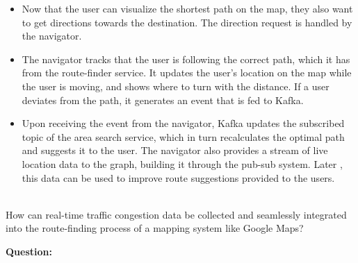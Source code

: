 \begin{itemize}
\begin{itemize}
\item
The route finder forwards the requests to an area search service with the source and the destination points.
\item
The area search service uses the distributed search to find the latitude/longitude for the source and the destination. It then calculates the area on the map spanning the two (source's and destination's) latitude/longitude points.
\item
After finding the area, the area search service asks the graph processing service to process part of the graph, depending on the area to find the optimal path.
\item
The graph processing service fetches the edges and nodes within that specified area from the database, finds the shortest path, and returns it to the route-finder service that visualizes the optimal path with the distance and time necessary to comeplete the route. It also displays the steps the user should follow for navigation.
\end{itemize}
\item
\protect{}\label{NxDi3RJc9fdWqSgFOlijI}
Now that the user can visualize the shortest path on the map, they also want to get directions towards the destination. The direction request is handled by the navigator.
\item
\protect{}\label{2RgVGB2QJdQM8UPs1y_iX}
The navigator tracks that the user is following the correct path, which it has from the route-finder service. It updates the user's location on the map while the user is moving, and shows where to turn with the distance. If a user deviates from the path, it generates an event that is fed to Kafka.
\item
\protect{}\label{CDHa6bIwob-VPlSjT3dKH}
Upon receiving the event from the navigator, Kafka updates the subscribed topic of the area search service, which in turn recalculates the optimal path and suggests it to the user. The navigator also provides a stream of live location data to the graph, building it through the pub-sub system. Later , this data can be used to improve route suggestions provided to the users.
\end{itemize}
\\
How can real-time traffic congestion data be collected and seamlessly integrated into the route-finding process of a mapping system like Google Maps?

\textbf{Question:}


